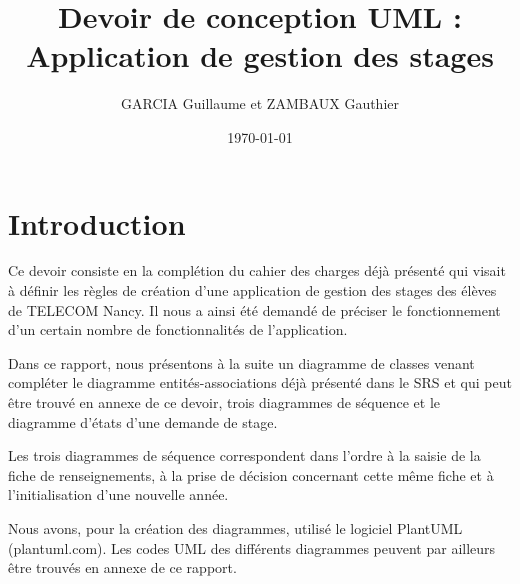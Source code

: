 \documentclass[11pt, a4paper]{report}
\title{Devoir de conception UML :\\Application de gestion des stages}
\author{GARCIA  Guillaume et ZAMBAUX Gauthier}
\date{\today}
\begin{document}
\maketitle


\chapter*{Introduction}
\hspace{1cm}Ce devoir consiste en la complétion du cahier des charges déjà présenté qui visait à définir les règles de création d’une application de gestion des stages des élèves de TELECOM Nancy. Il nous a ainsi été demandé de préciser le fonctionnement d’un certain nombre de fonctionnalités de l’application.\vspace{0.2cm}

\hspace{0.6cm}Dans ce rapport, nous présentons à la suite un diagramme de classes venant compléter le diagramme entités-associations déjà présenté dans le SRS et qui peut être trouvé en annexe de ce devoir, trois diagrammes de séquence et le diagramme d’états d’une demande de stage.\vspace{0.2cm}

\hspace{0.6cm}Les trois diagrammes de séquence correspondent dans l’ordre à la saisie de la fiche de renseignements, à la prise de décision concernant cette même fiche et à l’initialisation d’une nouvelle année.\vspace{0.2cm}

\hspace{0.6cm}Nous avons, pour la création des diagrammes, utilisé le logiciel PlantUML (plantuml.com). Les codes UML des différents diagrammes peuvent par ailleurs être trouvés en annexe de ce rapport.
\end{document}
